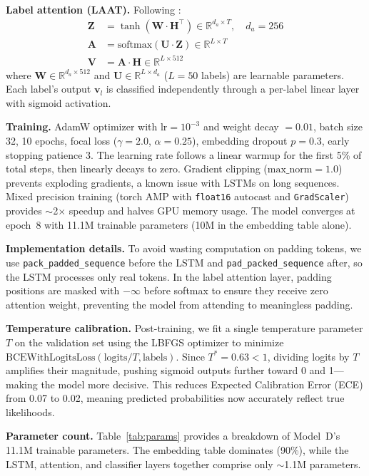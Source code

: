 \documentclass[11pt,a4paper]{article}
\begin{document}
\textbf{Label attention (LAAT).} Following \citet{vu2020label}:
\begin{align}
    \mathbf{Z} &= \tanh(\mathbf{W} \cdot \mathbf{H}^\top) \in \mathbb{R}^{d_a \times T}, \quad d_a = 256 \\
    \mathbf{A} &= \text{softmax}(\mathbf{U} \cdot \mathbf{Z}) \in \mathbb{R}^{L \times T} \\
    \mathbf{V} &= \mathbf{A} \cdot \mathbf{H} \in \mathbb{R}^{L \times 512}
\end{align}
where $\mathbf{W} \in \mathbb{R}^{d_a \times 512}$ and $\mathbf{U} \in \mathbb{R}^{L \times d_a}$ ($L = 50$ labels) are learnable parameters. Each label's output $\mathbf{v}_l$ is classified independently through a per-label linear layer with sigmoid activation.

\textbf{Training.} AdamW optimizer with $\text{lr} = 10^{-3}$ and weight decay $= 0.01$, batch size 32, 10 epochs, focal loss ($\gamma = 2.0$, $\alpha = 0.25$), embedding dropout $p = 0.3$, early stopping patience 3. The learning rate follows a linear warmup for the first 5\% of total steps, then linearly decays to zero. Gradient clipping ($\text{max\_norm} = 1.0$) prevents exploding gradients, a known issue with LSTMs on long sequences. Mixed precision training (torch AMP with \texttt{float16} autocast and \texttt{GradScaler}) provides $\sim$2$\times$ speedup and halves GPU memory usage. The model converges at epoch~8 with 11.1M trainable parameters (10M in the embedding table alone).

\textbf{Implementation details.} To avoid wasting computation on padding tokens, we use \texttt{pack\_padded\_sequence} before the LSTM and \texttt{pad\_packed\_sequence} after, so the LSTM processes only real tokens. In the label attention layer, padding positions are masked with $-\infty$ before softmax to ensure they receive zero attention weight, preventing the model from attending to meaningless padding.

\textbf{Temperature calibration.} Post-training, we fit a single temperature parameter $T$ on the validation set using the LBFGS optimizer to minimize $\text{BCEWithLogitsLoss}(\text{logits}/T, \text{labels})$. Since $T^* = 0.63 < 1$, dividing logits by $T$ amplifies their magnitude, pushing sigmoid outputs further toward 0 and 1---making the model more decisive. This reduces Expected Calibration Error (ECE) from 0.07 to 0.02, meaning predicted probabilities now accurately reflect true likelihoods.

\textbf{Parameter count.} Table~\ref{tab:params} provides a breakdown of Model~D's 11.1M trainable parameters. The embedding table dominates (90\%), while the LSTM, attention, and classifier layers together comprise only $\sim$1.1M parameters.
\end{document}
